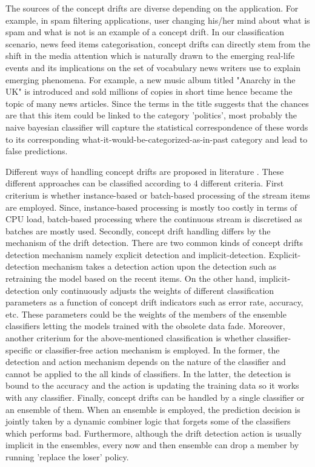 \documentclass{article} %
\begin{document}
The sources of the concept drifts are diverse depending on the application. For example, in spam filtering applications, user changing his/her mind about what is spam and what is not is an example of a concept drift. In our classification scenario, news feed items categorisation, concept drifts can directly stem from the shift in the media attention which is naturally drawn to the emerging real-life events and its implications on the set of vocabulary news writers use to explain emerging phenomena. For example, a new music album titled  "Anarchy in the UK"  is introduced and sold millions of copies in short time hence became the topic of many news articles. Since the terms in the title suggests that the chances are that this item could be linked to the category 'politics', most probably the naive bayesian classifier will capture the statistical correspondence of these words to its corresponding what-it-would-be-categorized-as-in-past category and lead to false predictions.

Different ways of handling concept drifts are proposed in literature \cite[p. 5]{KunchevaEnsembleOverview08}. These different approaches can be classified according to 4 different criteria. First criterium is whether instance-based or batch-based processing of the stream items are employed. Since, instance-based processing is mostly too costly in terms of CPU load, batch-based processing where the continuous stream is discretised as batches are mostly used. Secondly, concept drift handling differs by the mechanism of the drift detection. There are two common kinds of concept drifts detection mechanism namely explicit detection and implicit-detection. Explicit-detection mechanism takes a detection action upon the detection such as retraining the model based on the recent items. On the other hand, implicit-detection only continuously adjusts the weights of different classification parameters as a function of concept drift indicators such as error rate, accuracy, etc. These parameters could be the weights of the members of the ensemble classifiers letting the models trained with the obsolete data fade. Moreover, another criterium for the above-mentioned classification is whether classifier-specific or classifier-free action mechanism is employed. In the former, the detection and action mechanism depends on the nature of the classifier and cannot be applied to the all kinds of classifiers. In the latter, the detection is bound to the accuracy and the action is updating the training data so it works with any classifier. Finally, concept drifts can be handled by a single classifier or an ensemble of them. When an ensemble is employed, the prediction decision is jointly taken by a dynamic combiner logic that forgets some of the classifiers which performs bad. Furthermore, although the drift detection action is usually implicit in the ensembles, every now and then ensemble can drop a member by running 'replace the loser' policy.
\end{document}
